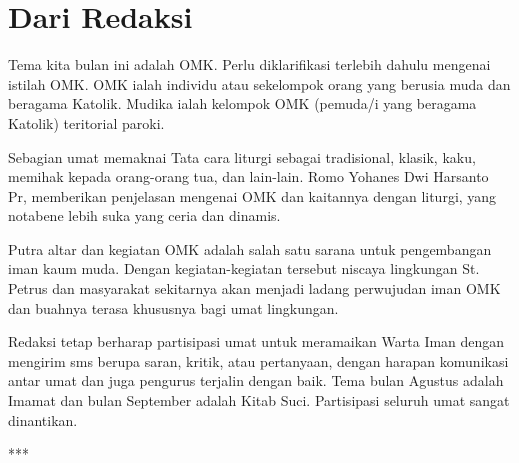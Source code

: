 \newpage

\chapter*{Dari Redaksi}
\footnotesize
{}

\bigskip
Tema kita bulan ini adalah OMK. Perlu diklarifikasi terlebih dahulu mengenai istilah OMK. OMK ialah individu atau sekelompok orang yang berusia muda dan beragama Katolik. Mudika ialah kelompok OMK  (pemuda/i yang beragama Katolik) teritorial paroki.

\bigskip
Sebagian umat memaknai Tata cara liturgi sebagai tradisional, klasik, kaku, memihak kepada orang-orang tua, dan lain-lain. Romo Yohanes Dwi Harsanto Pr, memberikan penjelasan mengenai OMK dan kaitannya dengan liturgi, yang notabene lebih suka yang ceria dan dinamis.  

\bigskip
Putra altar dan kegiatan OMK adalah salah satu sarana untuk pengembangan iman kaum muda. Dengan kegiatan-kegiatan tersebut
niscaya lingkungan St. Petrus dan masyarakat sekitarnya akan menjadi ladang perwujudan iman OMK dan buahnya terasa khususnya bagi umat lingkungan.

\bigskip
Redaksi tetap berharap partisipasi umat untuk meramaikan Warta Iman dengan mengirim sms berupa saran, kritik, atau pertanyaan, dengan harapan komunikasi antar umat dan juga pengurus terjalin dengan baik. Tema bulan Agustus adalah Imamat dan bulan September adalah Kitab Suci. Partisipasi seluruh umat sangat dinantikan.
\normalsize

\begin{center}***\end{center} 

\vfill

\normalsize

